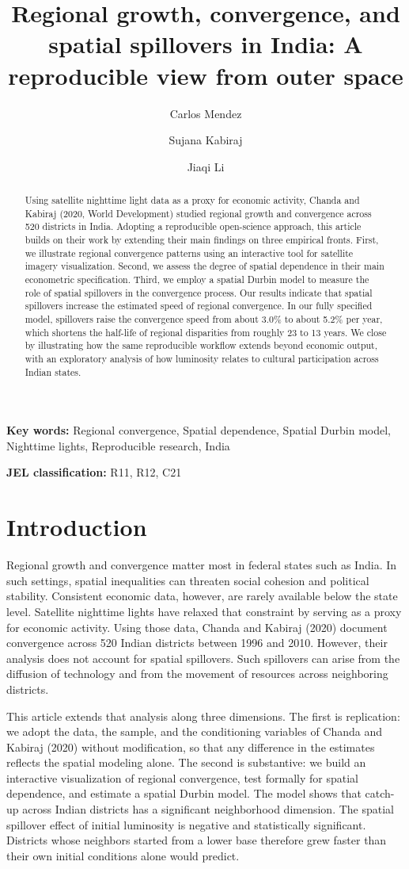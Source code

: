 \documentclass[
  letterpaper,
  DIV=11,
  numbers=noendperiod]{scrartcl}
\title{Regional growth, convergence, and spatial spillovers in India: A
reproducible view from outer space}
\author{Carlos Mendez \and Sujana Kabiraj \and Jiaqi Li}
\date{}
\providecommand{\keywords}[1]{\par\vspace{3mm}\noindent\textbf{Key words: }#1\par\vspace{3mm}}
\providecommand{\jel}[1]{\par\vspace{3mm}\noindent\textbf{JEL classification: }#1\par\vspace{3mm}}
\begin{document}
\maketitle
\begin{abstract}
Using satellite nighttime light data as a proxy for economic activity,
Chanda and Kabiraj (2020, World Development) studied regional growth and
convergence across 520 districts in India. Adopting a reproducible
open-science approach, this article builds on their work by extending
their main findings on three empirical fronts. First, we illustrate
regional convergence patterns using an interactive tool for satellite
imagery visualization. Second, we assess the degree of spatial
dependence in their main econometric specification. Third, we employ a
spatial Durbin model to measure the role of spatial spillovers in the
convergence process. Our results indicate that spatial spillovers
increase the estimated speed of regional convergence. In our fully
specified model, spillovers raise the convergence speed from about 3.0\%
to about 5.2\% per year, which shortens the half-life of regional
disparities from roughly 23 to 13 years. We close by illustrating how
the same reproducible workflow extends beyond economic output, with an
exploratory analysis of how luminosity relates to cultural participation
across Indian states.
\end{abstract}


\keywords{Regional convergence, Spatial dependence, Spatial Durbin model, Nighttime lights, Reproducible research, India}
\jel{R11, R12, C21}

\section{Introduction}\label{introduction}

Regional growth and convergence matter most in federal states such as
India. In such settings, spatial inequalities can threaten social
cohesion and political stability. Consistent economic data, however, are
rarely available below the state level. Satellite nighttime lights have
relaxed that constraint by serving as a proxy for economic activity.
Using those data, Chanda and Kabiraj (2020) document convergence across
520 Indian districts between 1996 and 2010. However, their analysis does
not account for spatial spillovers. Such spillovers can arise from the
diffusion of technology and from the movement of resources across
neighboring districts.

This article extends that analysis along three dimensions. The first is
replication: we adopt the data, the sample, and the conditioning
variables of Chanda and Kabiraj (2020) without modification, so that any
difference in the estimates reflects the spatial modeling alone. The
second is substantive: we build an interactive visualization of regional
convergence, test formally for spatial dependence, and estimate a
spatial Durbin model. The model shows that catch-up across Indian
districts has a significant neighborhood dimension. The spatial
spillover effect of initial luminosity is negative and statistically
significant. Districts whose neighbors started from a lower base
therefore grew faster than their own initial conditions alone would
predict.
\end{document}
